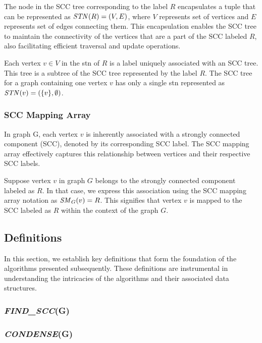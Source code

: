 The node in the SCC tree corresponding to the label $R$ encapsulates a tuple that can be represented as $\text{\textit{STN}}(R) = \left( V, E \right)$, 
where $V$ represents set of vertices and $E$ represents set of edges connecting them.
This encapsulation enables the SCC tree to maintain the connectivity of the vertices that are a part of the SCC labeled $R$,
also facilitating efficient traversal and update operations.

Each vertex $v \in V$ in the \ac{stn} of $R$ is a label uniquely associated with an SCC tree. 
This tree is a subtree of the SCC tree represented by the label $R$.
The SCC tree for a graph containing one vertex $v$ has only a single \ac{stn} represented as $\text{\textit{STN}}(v) = (\{v\}, \emptyset)$.



\subsubsection{SCC Mapping Array}\label{Subsubsec: SCC Mapping Array}
In graph G, each vertex $v$ is inherently associated with a strongly connected component (SCC), denoted by its corresponding SCC label. 
The SCC mapping array effectively captures this relationship between vertices and their respective SCC labels.

Suppose vertex $v$ in graph $G$ belongs to the strongly connected component labeled as $R$.
 In that case, we express this association using the SCC mapping array notation as $\text{\textit{SM}}_{G}(v)=R$. 
 This signifies that vertex $v$ is mapped to the SCC labeled as $R$ within the context of the graph $G$.


\subsection{Definitions}\label{Subsec: Definitions Theoretical}
In this section, we establish key definitions that form the foundation of the algorithms presented subsequently. 
These definitions are instrumental in understanding the intricacies of the algorithms and their associated data structures.

\subsubsection{\textit{FIND\_SCC}(G)}
\subsubsection{\textit{CONDENSE}(G)}
